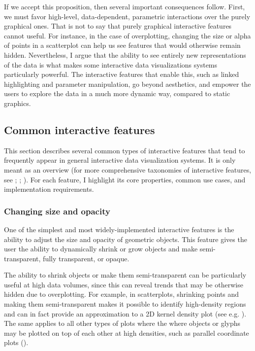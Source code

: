 \documentclass[
]{book}
\theoremstyle{definition}
\theoremstyle{definition}
\theoremstyle{definition}
\theoremstyle{definition}
\theoremstyle{remark}
\begin{document}
If we accept this proposition, then several important consequences follow. First, we must favor high-level, data-dependent, parametric interactions over the purely graphical ones. That is not to say that purely graphical interactive features cannot useful. For instance, in the case of overplotting, changing the size or alpha of points in a scatterplot can help us see features that would otherwise remain hidden. Nevertheless, I argue that the ability to see entirely new representations of the data is what makes some interactive data visualizations systems particularly powerful. The interactive features that enable this, such as linked highlighting and parameter manipulation, go beyond aesthetics, and empower the users to explore the data in a much more dynamic way, compared to static graphics.

\subsection{Common interactive features}\label{common-features}

This section describes several common types of interactive features that tend to frequently appear in general interactive data visualization systems. It is only meant as an overview (for more comprehensive taxonomies of interactive features, see ; ; ). For each feature, I highlight its core properties, common use cases, and implementation requirements.

\subsubsection{Changing size and opacity}\label{changing-size-and-opacity}

One of the simplest and most widely-implemented interactive features is the ability to adjust the size and opacity of geometric objects. This feature gives the user the ability to dynamically shrink or grow objects and make semi-transparent, fully transparent, or opaque.

The ability to shrink objects or make them semi-transparent can be particularly useful at high data volumes, since this can reveal trends that may be otherwise hidden due to overplotting. For example, in scatterplots, shrinking points and making them semi-transparent makes it possible to identify high-density regions and can in fact provide an approximation to a 2D kernel density plot (see e.g. ). The same applies to all other types of plots where the where objects or glyphs may be plotted on top of each other at high densities, such as parallel coordinate plots ().
\end{document}

